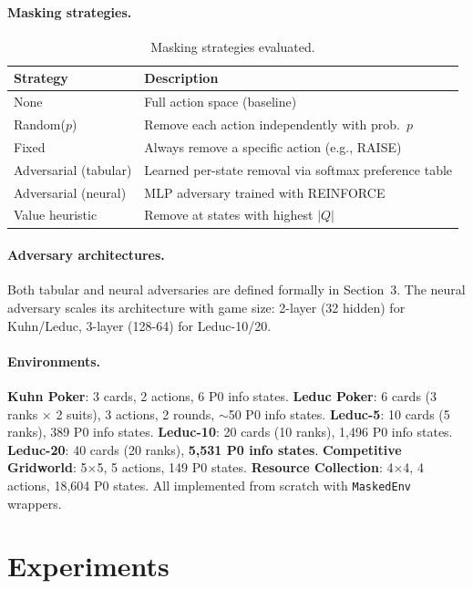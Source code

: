 \documentclass{article}
\begin{document}
\paragraph{Masking strategies.}
\begin{table}[ht]
\centering
\caption{Masking strategies evaluated.}
\label{tab:strategies}
\begin{tabular}{ll}
\toprule
Strategy & Description \\
\midrule
None & Full action space (baseline) \\
Random($p$) & Remove each action independently with prob.\ $p$ \\
Fixed & Always remove a specific action (e.g., RAISE) \\
Adversarial (tabular) & Learned per-state removal via softmax preference table \\
Adversarial (neural) & MLP adversary trained with REINFORCE \\
Value heuristic & Remove at states with highest $|Q|$ \\
\bottomrule
\end{tabular}
\end{table}

\paragraph{Adversary architectures.}
Both tabular and neural adversaries are defined formally in Section~3. The neural adversary scales its architecture with game size: 2-layer (32 hidden) for Kuhn/Leduc, 3-layer (128-64) for Leduc-10/20.

\paragraph{Environments.}
\textbf{Kuhn Poker}: 3 cards, 2 actions, 6 P0 info states.
\textbf{Leduc Poker}: 6 cards (3 ranks $\times$ 2 suits), 3 actions, 2 rounds, $\sim$50 P0 info states.
\textbf{Leduc-5}: 10 cards (5 ranks), 389 P0 info states.
\textbf{Leduc-10}: 20 cards (10 ranks), 1,496 P0 info states.
\textbf{Leduc-20}: 40 cards (20 ranks), \textbf{5,531 P0 info states}.
\textbf{Competitive Gridworld}: 5$\times$5, 5 actions, 149 P0 states.
\textbf{Resource Collection}: 4$\times$4, 4 actions, 18,604 P0 states.
All implemented from scratch with \texttt{MaskedEnv} wrappers.

\section{Experiments}
\end{document}
